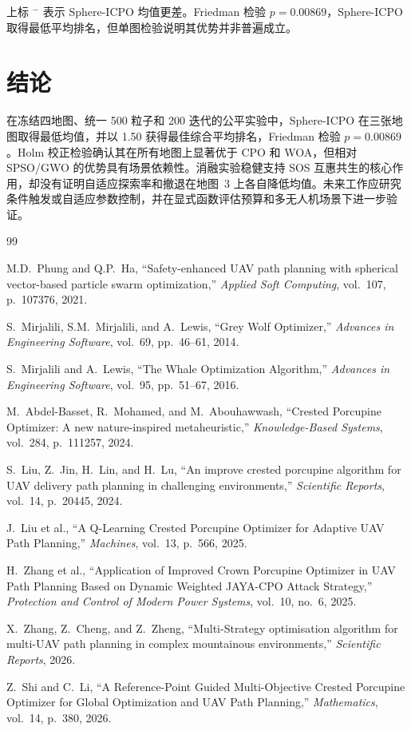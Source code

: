 \documentclass[11pt,a4paper]{ctexart}
\begin{document}
上标 $^{-}$ 表示 Sphere-ICPO 均值更差。Friedman 检验 $p=0.00869$，Sphere-ICPO 取得最低平均排名，但单图检验说明其优势并非普遍成立。

\section{结论}

在冻结四地图、统一 500 粒子和 200 迭代的公平实验中，Sphere-ICPO 在三张地图取得最低均值，并以 1.50 获得最佳综合平均排名，Friedman 检验 $p=0.00869$。Holm 校正检验确认其在所有地图上显著优于 CPO 和 WOA，但相对 SPSO/GWO 的优势具有场景依赖性。消融实验稳健支持 SOS 互惠共生的核心作用，却没有证明自适应探索率和撤退在地图~3 上各自降低均值。未来工作应研究条件触发或自适应参数控制，并在显式函数评估预算和多无人机场景下进一步验证。

\begin{thebibliography}{99}

 M.D.~Phung and Q.P.~Ha, ``Safety-enhanced UAV path planning with spherical vector-based particle swarm optimization,'' \textit{Applied Soft Computing}, vol.~107, p.~107376, 2021.

 S.~Mirjalili, S.M.~Mirjalili, and A.~Lewis, ``Grey Wolf Optimizer,'' \textit{Advances in Engineering Software}, vol.~69, pp.~46--61, 2014.

 S.~Mirjalili and A.~Lewis, ``The Whale Optimization Algorithm,'' \textit{Advances in Engineering Software}, vol.~95, pp.~51--67, 2016.

 M.~Abdel-Basset, R.~Mohamed, and M.~Abouhawwash, ``Crested Porcupine Optimizer: A new nature-inspired metaheuristic,'' \textit{Knowledge-Based Systems}, vol.~284, p.~111257, 2024.

 S.~Liu, Z.~Jin, H.~Lin, and H.~Lu, ``An improve crested porcupine algorithm for UAV delivery path planning in challenging environments,'' \textit{Scientific Reports}, vol.~14, p.~20445, 2024.

 J.~Liu et al., ``A Q-Learning Crested Porcupine Optimizer for Adaptive UAV Path Planning,'' \textit{Machines}, vol.~13, p.~566, 2025.

 H.~Zhang et al., ``Application of Improved Crown Porcupine Optimizer in UAV Path Planning Based on Dynamic Weighted JAYA-CPO Attack Strategy,'' \textit{Protection and Control of Modern Power Systems}, vol.~10, no.~6, 2025.

 X.~Zhang, Z.~Cheng, and Z.~Zheng, ``Multi-Strategy optimisation algorithm for multi-UAV path planning in complex mountainous environments,'' \textit{Scientific Reports}, 2026.

 Z.~Shi and C.~Li, ``A Reference-Point Guided Multi-Objective Crested Porcupine Optimizer for Global Optimization and UAV Path Planning,'' \textit{Mathematics}, vol.~14, p.~380, 2026.

\end{thebibliography}
\end{document}
